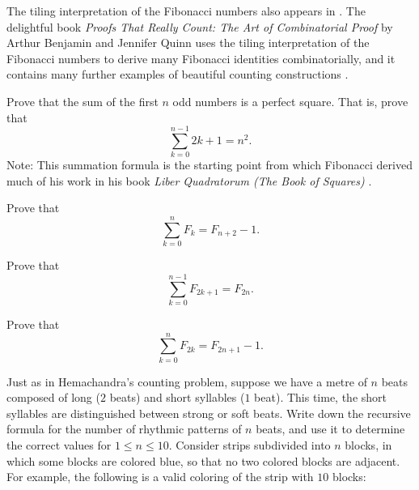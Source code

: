 The tiling interpretation of the Fibonacci numbers also appears in \cite{brigham1996}. The delightful book \emph{Proofs That Really Count: The Art of Combinatorial Proof} by Arthur Benjamin and Jennifer Quinn uses the tiling interpretation of the Fibonacci numbers to derive many Fibonacci identities combinatorially, and it contains many further examples of beautiful counting constructions \cite{benjamin2003}.

\clearpage%

\exercises

\begin{starter}
  \exercise \label{exercise:sum-of-odd-numbers}Prove that the sum of the first $n$ odd numbers is a perfect square. That is, prove that
  \begin{equation*}
    \sum_{k=0}^{n-1} 2k+1 = n^2.
  \end{equation*}
  Note: This summation formula is the starting point from which Fibonacci derived much of his work in his book  \emph{Liber Quadratorum (The Book of Squares)} \cite{fibonacci1987}.
  \exercise
  \begin{subexenum}
  \item Prove that
    \begin{equation*}
      \sum_{k=0}^nF_k = F_{n+2}-1.
    \end{equation*}
  \item Prove that
    \begin{equation*}
      \sum_{k=0}^{n-1}F_{2k+1}=F_{2n}.
    \end{equation*}
  \item Prove that
    \begin{equation*}
      \sum_{k=0}^{n}F_{2k}=F_{2n+1}-1.
    \end{equation*}
  \end{subexenum}  
  \exercise Just as in Hemachandra's counting problem, suppose we have a metre of $n$ beats composed of long ($2$ beats) and short syllables ($1$ beat). This time, the short syllables are distinguished between strong or soft beats. Write down the recursive formula for the number of rhythmic patterns of $n$ beats, and use it to determine the correct values for $1\leq n\leq 10$.
  \exercise \label{exercise:hemachandra-variant}Consider strips subdivided into $n$ blocks, in which some blocks are colored blue, so that no two colored blocks are adjacent. For example, the following is a valid coloring of the strip with $10$ blocks:
  \begin{center}
\end{center}
\end{starter}
